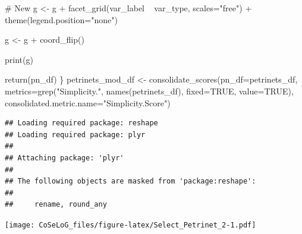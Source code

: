 \documentclass[]{article}
\newenvironment{Shaded}{\begin{snugshade}}{\end{snugshade}}
\newcommand{\KeywordTok}[1]{\textcolor[rgb]{0.94,0.87,0.69}{{#1}}}
\newcommand{\DataTypeTok}[1]{\textcolor[rgb]{0.87,0.87,0.75}{{#1}}}
\newcommand{\StringTok}[1]{\textcolor[rgb]{0.80,0.58,0.58}{{#1}}}
\newcommand{\CommentTok}[1]{\textcolor[rgb]{0.50,0.62,0.50}{{#1}}}
\newcommand{\OtherTok}[1]{\textcolor[rgb]{0.94,0.94,0.56}{{#1}}}
\newcommand{\NormalTok}[1]{\textcolor[rgb]{0.80,0.80,0.80}{{#1}}}
\begin{document}
\begin{Shaded}
\begin{Highlighting}[]
    \CommentTok{# New}
    \NormalTok{g <-}\StringTok{ }\NormalTok{g +}\StringTok{ }\KeywordTok{facet_grid}\NormalTok{(var_label ~}\StringTok{ }\NormalTok{var_type, }\DataTypeTok{scales=}\StringTok{"free"}\NormalTok{) +}\StringTok{ }
\StringTok{             }\KeywordTok{theme}\NormalTok{(}\DataTypeTok{legend.position=}\StringTok{"none"}\NormalTok{)}
    
    \NormalTok{g <-}\StringTok{ }\NormalTok{g +}\StringTok{ }\KeywordTok{coord_flip}\NormalTok{()}

    \KeywordTok{print}\NormalTok{(g)}
    
    \KeywordTok{return}\NormalTok{(pn_df)}
\NormalTok{\}}
\NormalTok{petrinets_mod_df <-}\StringTok{ }\KeywordTok{consolidate_scores}\NormalTok{(}\DataTypeTok{pn_df=}\NormalTok{petrinets_df, }
            \DataTypeTok{metrics=}\KeywordTok{grep}\NormalTok{(}\StringTok{"Simplicity."}\NormalTok{, }\KeywordTok{names}\NormalTok{(petrinets_df), }\DataTypeTok{fixed=}\OtherTok{TRUE}\NormalTok{, }\DataTypeTok{value=}\OtherTok{TRUE}\NormalTok{), }
            \DataTypeTok{consolidated.metric.name=}\StringTok{"Simplicity.Score"}\NormalTok{)}
\end{Highlighting}
\end{Shaded}

\begin{verbatim}
## Loading required package: reshape
## Loading required package: plyr
## 
## Attaching package: 'plyr'
## 
## The following objects are masked from 'package:reshape':
## 
##     rename, round_any
\end{verbatim}

\texttt{[image: CoSeLoG\_files/figure-latex/Select\_Petrinet\_2-1.pdf]}
\end{document}
